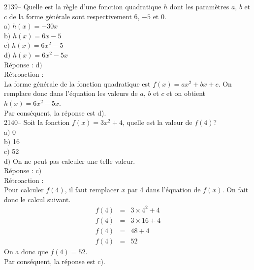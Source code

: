 \documentclass[letterpaper, 12pt]{article}
\begin{document}
2139-- Quelle est la r\`egle d'une fonction quadratique $h$ dont les param\`etres $a$, $b$ et $c$ de la forme g\'en\'erale sont respectivement 6, $-5$ et 0.\\

a$)$ $h(x)=-30x$\\
b$)$ $h(x)=6x-5$\\
c$)$ $h(x)=6x^{2}-5$\\
d$)$ $h(x)=6x^{2}-5x$\\

R\'eponse : d$)$\\

R\'etroaction :\\
La forme g\'en\'erale de la fonction quadratique est $f(x)=ax^{2}+bx+c$. On remplace donc dans l'\'equation les valeurs de $a$, $b$ et $c$ et on obtient $h(x)=6x^{2}-5x$.\\
Par cons\'equent, la r\'eponse est d).\\


2140-- Soit la fonction $f(x)=3x^{2}+4$, quelle est la valeur de $f(4)$?\\

a$)$ 0\\
b$)$ 16\\
c$)$ 52\\
d$)$ On ne peut pas calculer une telle valeur.\\

R\'eponse : c$)$\\

R\'etroaction :\\
Pour calculer $f(4)$, il faut remplacer $x$ par 4 dans l'\'equation de $f(x)$. On fait donc le calcul suivant.
\begin{eqnarray*}
 f(4)&=&3\times4^{2}+4\\
 f(4)&=&3\times16+4\\
 f(4)&=&48+4\\
 f(4)&=&52
\end{eqnarray*}
On a donc que $f(4)=52$.\\
Par cons\'equent, la r\'eponse est c).\\
\end{document}
